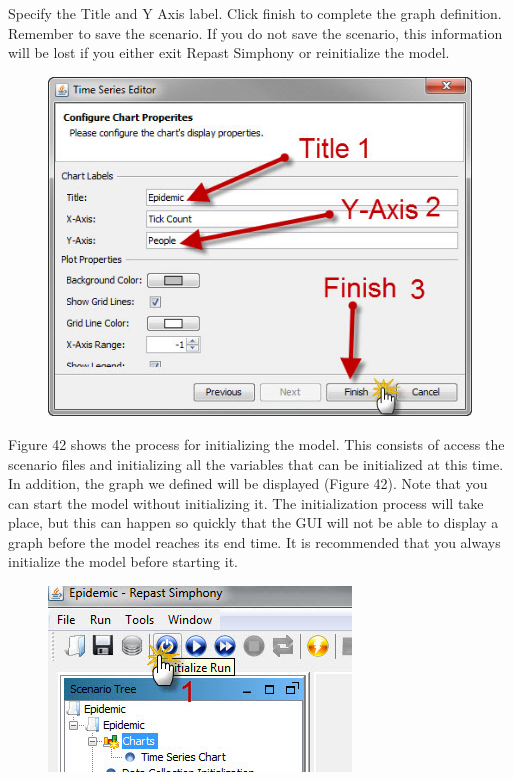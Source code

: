 \documentclass[11pt]{amsart}
\begin{document}
Specify the Title and Y Axis label. Click finish to complete the graph definition. Remember to save the scenario. If you do not save the scenario, this information will be lost if you either exit Repast Simphony or reinitialize the model.

\begin{figure}[ht]
\begin{center}
\vspace{.2in}
\centerline {
\includegraphics[totalheight=0.3\textheight]{images/039.jpg}
}
\caption{}
\label{fig:039}
\end{center}
\end{figure}

Figure 42 shows the process for initializing the model. This consists of access the scenario files and initializing all the variables that can be initialized at this time. In addition, the graph we defined will be displayed (Figure 42). Note that you can start the model without initializing it. The initialization process will take place, but this can happen so quickly that the GUI will not be able to display a graph before the model reaches its end time. It is recommended that you always initialize the model before starting it.


\begin{figure}[ht]
\begin{center}
\vspace{.2in}
\centerline {
\includegraphics[totalheight=0.3\textheight]{images/040.jpg}
}
\caption{}
\label{fig:040}
\end{center}
\end{figure}
\end{document}
